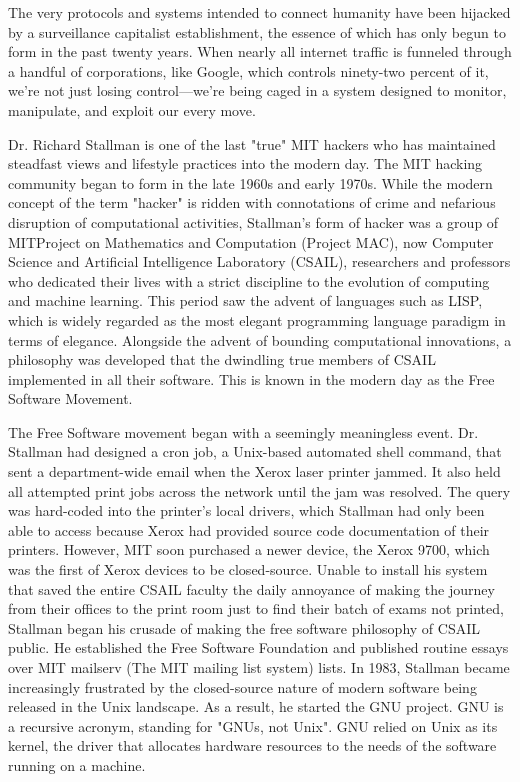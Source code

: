 \documentclass{article}
\begin{document}
The very protocols and systems intended to connect humanity have been hijacked by a surveillance capitalist establishment, the essence of which has only begun to form in the past twenty years. When nearly all internet traffic is funneled through a handful of corporations, like Google, which controls ninety-two percent of it, we’re not just losing control—we’re being caged in a system designed to monitor, manipulate, and exploit our every move.

Dr. Richard Stallman is one of the last "true" MIT hackers who has maintained steadfast views and lifestyle practices into the modern day. The MIT hacking community began to form in the late 1960s and early 1970s. While the modern concept of the term "hacker" is ridden with connotations of crime and nefarious disruption of computational activities, Stallman's form of hacker was a group of MITProject on Mathematics and Computation (Project MAC), now Computer Science and Artificial Intelligence Laboratory (CSAIL), researchers and professors who dedicated their lives with a strict discipline to the evolution of computing and machine learning. This period saw the advent of languages such as LISP, which is widely regarded as the most elegant programming language paradigm in terms of elegance. Alongside the advent of bounding computational innovations, a philosophy was developed that the dwindling true members of CSAIL implemented in all their software. This is known in the modern day as the Free Software Movement. 

    The Free Software movement began with a seemingly meaningless event. Dr. Stallman had designed a cron job, a Unix-based automated shell command, that sent a department-wide email when the Xerox laser printer jammed. It also held all attempted print jobs across the network until the jam was resolved. The query was hard-coded into the printer's local drivers, which Stallman had only been able to access because Xerox had provided source code documentation of their printers. However, MIT soon purchased a newer device, the Xerox 9700, which was the first of Xerox devices to be closed-source. Unable to install his system that saved the entire CSAIL faculty the daily annoyance of making the journey from their offices to the print room just to find their batch of exams not printed, Stallman began his crusade of making the free software philosophy of CSAIL public. He established the Free Software Foundation and published routine essays over MIT mailserv (The MIT mailing list system) lists. In 1983, Stallman became increasingly frustrated by the closed-source nature of modern software being released in the Unix landscape. As a result, he started the GNU project. GNU is a recursive acronym, standing for "GNUs, not Unix". GNU relied on Unix as its kernel, the driver that allocates hardware resources to the needs of the software running on a machine.
\end{document}
